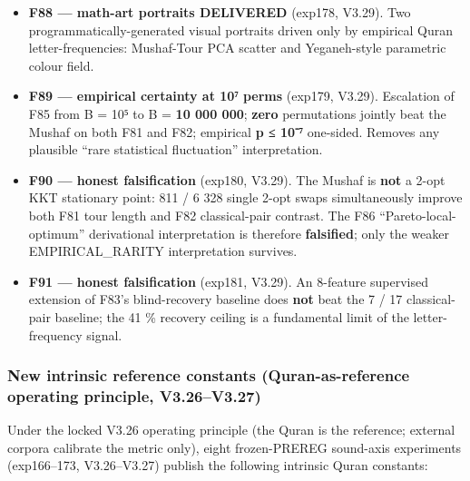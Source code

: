 \documentclass[
]{article}
\begin{document}
\begin{itemize}
\item
  \textbf{F88 --- math-art portraits DELIVERED} (exp178, V3.29). Two
  programmatically-generated visual portraits driven only by empirical
  Quran letter-frequencies: Mushaf-Tour PCA scatter and Yeganeh-style
  parametric colour field.
\item
  \textbf{F89 --- empirical certainty at 10⁷ perms} (exp179, V3.29).
  Escalation of F85 from B = 10⁵ to B = \textbf{10 000 000};
  \textbf{zero} permutations jointly beat the Mushaf on both F81 and
  F82; empirical \textbf{p ≤ 10⁻⁷} one-sided. Removes any plausible
  ``rare statistical fluctuation'' interpretation.
\item
  \textbf{F90 --- honest falsification} (exp180, V3.29). The Mushaf is
  \textbf{not} a 2-opt KKT stationary point: 811 / 6 328 single 2-opt
  swaps simultaneously improve both F81 tour length and F82
  classical-pair contrast. The F86 ``Pareto-local-optimum'' derivational
  interpretation is therefore \textbf{falsified}; only the weaker
  EMPIRICAL\_RARITY interpretation survives.
\item
  \textbf{F91 --- honest falsification} (exp181, V3.29). An 8-feature
  supervised extension of F83's blind-recovery baseline does
  \textbf{not} beat the 7 / 17 classical-pair baseline; the 41 \%
  recovery ceiling is a fundamental limit of the letter-frequency
  signal.
\end{itemize}

\subsubsection{New intrinsic reference constants (Quran-as-reference
operating principle,
V3.26--V3.27)}\label{new-intrinsic-reference-constants-quran-as-reference-operating-principle-v3.26v3.27}

Under the locked V3.26 operating principle (the Quran is the reference;
external corpora calibrate the metric only), eight frozen-PREREG
sound-axis experiments (exp166--173, V3.26--V3.27) publish the following
intrinsic Quran constants:
\end{document}
